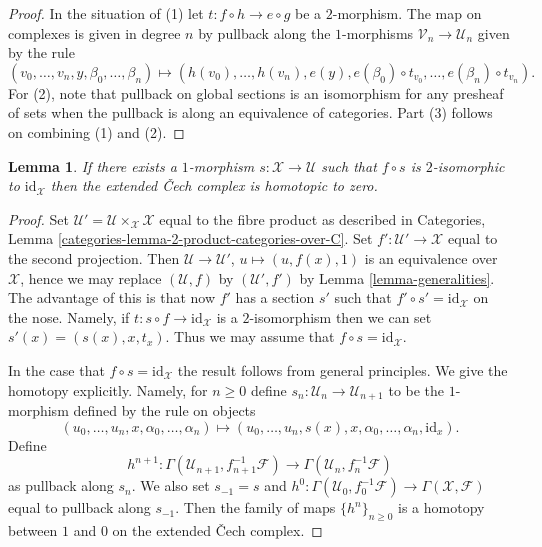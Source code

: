 \documentclass{stacks-project}
\theoremstyle{plain}
\newtheorem{lemma}[subsection]{Lemma}
\theoremstyle{definition}
\theoremstyle{remark}
\numberwithin{equation}{subsection}
\begin{document}
\begin{proof}
In the situation of (1) let $t : f \circ h \to e \circ g$ be a $2$-morphism.
The map on complexes is given in degree $n$ by
pullback along the $1$-morphisms
$\mathcal{V}_n \to \mathcal{U}_n$ given by the rule
$$
(v_0, \ldots, v_n, y, \beta_0, \ldots, \beta_n)
\longmapsto
(h(v_0), \ldots, h(v_n), e(y),
e(\beta_0) \circ t_{v_0}, \ldots, e(\beta_n) \circ t_{v_n}).
$$
For (2), note that pullback on global sections is an isomorphism
for any presheaf of sets when the pullback is along an equivalence
of categories. Part (3) follows on combining (1) and (2).
\end{proof}

\begin{lemma}
\label{lemma-homotopy}
If there exists a $1$-morphism $s : \mathcal{X} \to \mathcal{U}$
such that $f \circ s$ is $2$-isomorphic to $\text{id}_\mathcal{X}$
then the extended {\v C}ech complex is homotopic to zero.
\end{lemma}

\begin{proof}
Set $\mathcal{U}' = \mathcal{U} \times_\mathcal{X} \mathcal{X}$
equal to the fibre product as described in
Categories, Lemma \ref{categories-lemma-2-product-categories-over-C}.
Set $f' : \mathcal{U}' \to \mathcal{X}$ equal to the second projection.
Then $\mathcal{U} \to \mathcal{U}'$, $u \mapsto (u, f(x), 1)$
is an equivalence over $\mathcal{X}$, hence we may replace
$(\mathcal{U}, f)$ by $(\mathcal{U}', f')$ by
Lemma \ref{lemma-generalities}.
The advantage of this is that now $f'$ has a section $s'$ such
that $f' \circ s' = \text{id}_\mathcal{X}$ on the nose. Namely, if
$t : s \circ f \to \text{id}_\mathcal{X}$ is a $2$-isomorphism
then we can set $s'(x) = (s(x), x, t_x)$. Thus we may assume that
$f \circ s = \text{id}_\mathcal{X}$.

\medskip\noindent
In the case that $f \circ s = \text{id}_\mathcal{X}$ the result follows
from general principles. We give the homotopy explicitly. Namely,
for $n \geq 0$ define $s_n : \mathcal{U}_n \to \mathcal{U}_{n + 1}$
to be the $1$-morphism defined by the rule on objects
$$
(u_0, \ldots, u_n, x, \alpha_0, \ldots, \alpha_n)
\longmapsto
(u_0, \ldots, u_n, s(x), x,
\alpha_0, \ldots, \alpha_n, \text{id}_x).
$$
Define
$$
h^{n + 1} :
\Gamma(\mathcal{U}_{n + 1}, f_{n + 1}^{-1}\mathcal{F})
\longrightarrow
\Gamma(\mathcal{U}_n, f_n^{-1}\mathcal{F})
$$
as pullback along $s_n$. We also set $s_{-1} = s$ and
$h^0 : \Gamma(\mathcal{U}_0, f_0^{-1}\mathcal{F}) \to
\Gamma(\mathcal{X}, \mathcal{F})$ equal to pullback along $s_{-1}$.
Then the family of maps $\{h^n\}_{n \geq 0}$ is a homotopy between
$1$ and $0$ on the extended {\v C}ech complex.
\end{proof}
\end{document}
